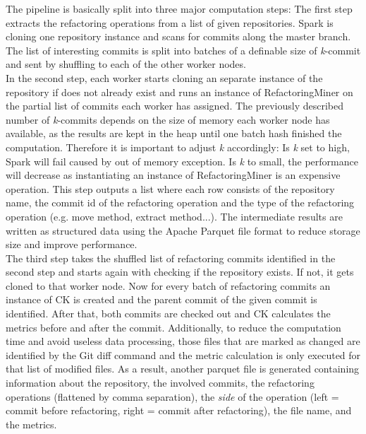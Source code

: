 The pipeline is basically split into three major computation steps: The first step extracts the refactoring operations from a list of given repositories. Spark is cloning one repository instance and scans for commits along the master branch. The list of interesting commits is split into batches of a definable size of \emph{k}-commit and sent by shuffling to each of the other worker nodes.\\
In the second step, each worker starts cloning an separate instance of the repository if does not already exist and runs an instance of RefactoringMiner on the partial list of commits each worker has assigned. The previously described number of \emph{k}-commits depends on the size of memory each worker node has available, as the results are kept in the heap until one batch hash finished the computation. Therefore it is important to adjust \emph{k} accordingly: Is \emph{k} set to high, Spark will fail caused by out of memory exception. Is \emph{k} to small, the performance will decrease as instantiating an instance of RefactoringMiner is an expensive operation. This step outputs a list where each row consists of the repository name, the commit id of the refactoring operation and the type of the refactoring operation (e.g. move method, extract method...). The intermediate results are written as structured data using the Apache Parquet file format \cite{parquet} to reduce storage size and improve performance.\\
The third step takes the shuffled list of refactoring commits identified in the second step and starts again with checking if the repository exists. If not, it gets cloned to that worker node. Now for every batch of refactoring commits an instance of CK is created and the parent commit of the given commit is identified. After that, both commits are checked out and CK calculates the metrics before and after the commit. Additionally, to reduce the computation time and avoid useless data processing, those files that are marked as changed are identified by the Git diff command and the metric calculation is only executed for that list of modified files. As a result, another parquet file is generated containing information about the repository, the involved commits, the refactoring operations (flattened by comma separation), the \emph{side} of the operation (left = commit before refactoring, right = commit after refactoring), the file name, and the metrics.
